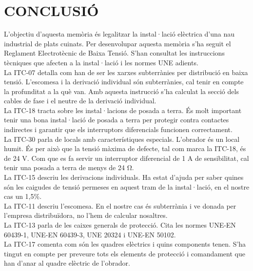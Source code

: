 \chapter{\uppercase{Conclusió}}
L'objectiu d'aquesta memòria és legalitzar la instal·lació elèctrica d'una nau industrial de plats cuinats.
Per desenvolupar aquesta memòria s'ha seguit el Reglament Electrotècnic de Baixa Tensió. S'han consultat les instruccions tècniques que afecten a la instal·lació i les normes UNE adients.\\
\newline La ITC-07 detalla com han de ser les xarxes subterrànies per distribució en baixa tensió. L'escomesa i la derivació individual són subterrànies, cal tenir en compte la profunditat a la què van. Amb aquesta instrucció s'ha calculat la secció dels cables de fase i el neutre de la derivació individual.\\
\newline La ITC-18 tracta sobre les instal·lacions de posada a terra. És molt important tenir una bona instal·lació de posada a terra per protegir contra contactes indirectes i garantir que els interruptors diferencials funcionen correctament.\\
\newline La ITC-30 parla de locals amb característiques especials. L'obrador és un local humit. És per això que la tensió màxima de defecte, tal com marca la ITC-18, és de 24 V. Com que es fa servir un interruptor diferencial de 1 A de sensibilitat, cal tenir una posada a terra de menys de 24 $\si\ohm$.\\
\newline La ITC-15 descriu les derivacions individuals. Ha estat d'ajuda per saber quines són les caigudes de tensió permeses en aquest tram de la instal·lació, en el nostre cas un 1,5\%.\\
\newline La ITC-11 descriu l'escomesa. En el nostre cas és subterrània i ve donada per l'empresa distribuïdora, no l'hem de calcular nosaltres.\\
\newline La ITC-13 parla de les caixes generals de protecció. Cita les normes UNE-EN 60439-1, UNE-EN 60439-3, UNE 20324 i UNE-EN 50102.\\
\newline La ITC-17 comenta com són les quadres elèctrics i quins components tenen. S'ha tingut en compte per preveure tots els elements de protecció i comandament que han d'anar al quadre elèctric de l'obrador.\\
